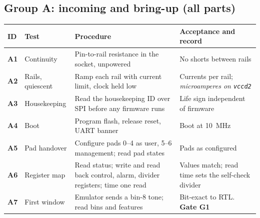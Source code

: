 \documentclass[10pt]{article}
\newcommand{\tid}[1]{\textbf{#1}}
\newcommand{\pred}[1]{\textit{#1}}
\begin{document}
\subsection*{Group A: incoming and bring-up \normalfont(all parts)}
{\small
\begin{longtable}{@{}L{0.8cm}L{3.3cm}L{6.6cm}L{4.3cm}@{}}
\toprule
ID & Test & Procedure & Acceptance and record\\
\midrule
\endhead
\tid{A1} & Continuity & Pin-to-rail resistance in the socket, unpowered & No shorts between rails\\
\tid{A2} & Rails, quiescent & Ramp each rail with current limit, clock held low & Currents per rail; \pred{microamperes on \texttt{vccd2}}\\
\tid{A3} & Housekeeping & Read the housekeeping ID over SPI before any firmware runs & Life sign independent of firmware\\
\tid{A4} & Boot & Program flash, release reset, UART banner & Boot at \SI{10}{\mega\hertz}\\
\tid{A5} & Pad handover & Configure pads 0--4 as user, 5--6 management; read pad states & Pads as configured\\
\tid{A6} & Register map & Read status; write and read back control, alarm, divider registers; time one read & Values match; read time sets the self-check divider\\
\tid{A7} & First window & Emulator sends a bin-8 tone; read bins and features & Bit-exact to RTL. \textbf{Gate G1}\\
\bottomrule
\end{longtable}}
\end{document}
